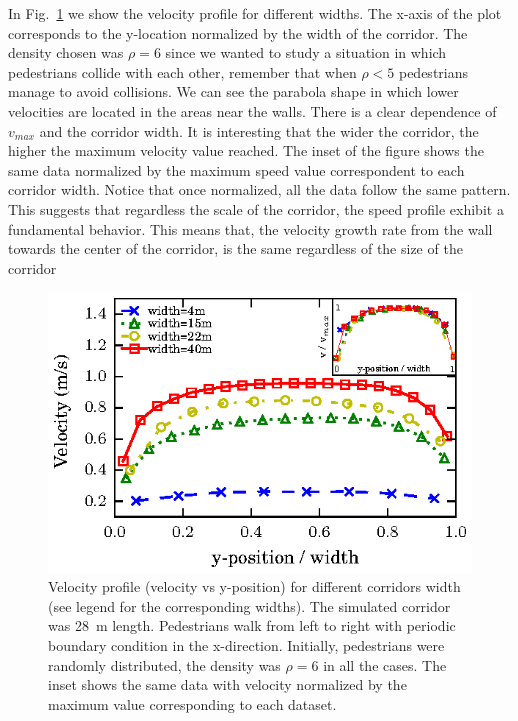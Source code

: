 In Fig.~\ref{speed-profile-multi_width} we show the velocity profile for different widths. The x-axis of the plot corresponds to the y-location normalized by the width of the corridor. The density chosen was $\rho = 6$ since we wanted to study a situation in which pedestrians collide with each other, remember that when $\rho<5$ pedestrians manage to avoid collisions. We can see the parabola shape in which lower velocities are located in the areas near the walls. There is a clear dependence of $v_{max}$ and the corridor width. It is interesting that the wider the corridor, the higher the maximum velocity value reached. The inset of the figure shows the same data normalized by the maximum speed value correspondent to each corridor width. Notice that once normalized, all the data follow the same pattern. This suggests that regardless the scale of the corridor, the speed profile exhibit a fundamental behavior. This means that, the velocity growth rate from the wall towards the center of the corridor, is the same regardless of the size of the corridor

\begin{figure}[htbp!]
\includegraphics[width=\columnwidth]
{plots/v(y)_multi_width.eps}
\caption{\label{speed-profile-multi_width} Velocity profile (velocity vs y-position) for different corridors width (see legend for the corresponding widths). The simulated corridor was 28~m length. Pedestrians walk from left to right with periodic boundary condition in the x-direction. Initially, pedestrians were randomly distributed, the density was $\rho = 6$ in all the cases. The inset shows the same data with velocity normalized by the maximum value corresponding to each dataset. }
\end{figure}



